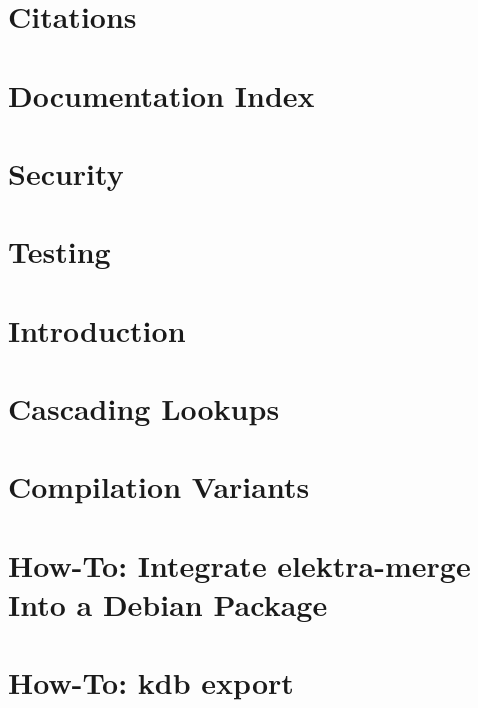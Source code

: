 \documentclass[twoside]{book}
\newcommand{\+}{\discretionary{\mbox{\scriptsize$\hookleftarrow$}}{}{}}
\begin{document}
\chapter{Citations}
\label{doc_paper_README_md}

\chapter{Documentation Index}
\label{doc_README_md}

\chapter{Security}
\label{doc_SECURITY_md}

\chapter{Testing}
\label{doc_TESTING_md}

\chapter{Introduction}
\label{doc_tutorials_application-integration_md}

\chapter{Cascading Lookups}
\label{doc_tutorials_cascading_md}

\chapter{Compilation Variants}
\label{doc_tutorials_compilation-variants_md}

\chapter{How-\/\+To\+: Integrate elektra-\/merge Into a Debian Package}
\label{doc_tutorials_elektra-merge-integration_md}

\chapter{How-\/\+To\+: kdb export}
\label{doc_tutorials_export_md}

\end{document}
